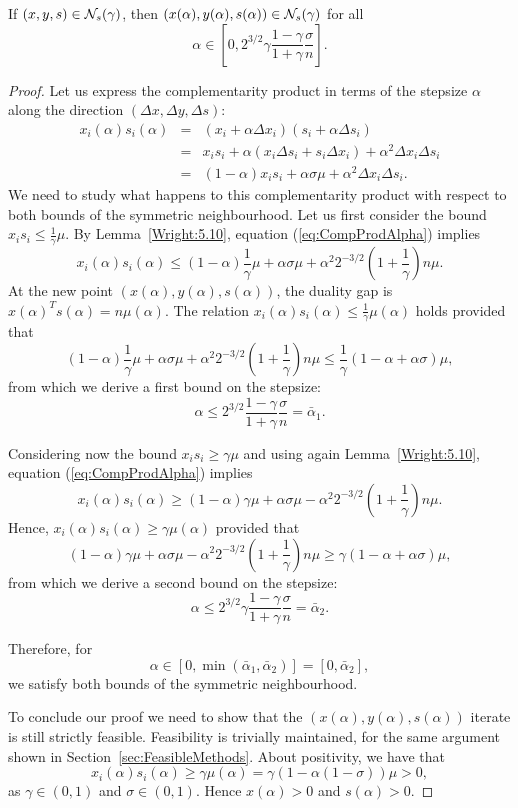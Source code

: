 \begin{theorem} \label{th:SymNeighbourhood}
  If $(x,y,s)\in\mathcal{N}_s(\gamma)$, then 
  $\left(x(\alpha),y(\alpha),s(\alpha)\right)\in\mathcal{N}_s(\gamma)$ for all
  \[
  \alpha\in \left[0,2^{3/2}\gamma\frac{1-\gamma}{1+\gamma}\frac{\sigma}{n} \right].
  \]
\end{theorem}
\begin{proof}
Let us express the complementarity product in terms of the stepsize 
$\alpha$ along the direction $(\Delta x, \Delta y, \Delta s)$:
%
\begin{eqnarray} \label{eq:CompProdAlpha}
x_i(\alpha)s_i(\alpha)&=&(x_i+\alpha\Delta x_i)(s_i+\alpha\Delta s_i)\nonumber\\ 
&=& x_is_i+\alpha(x_i\Delta s_i +s_i\Delta x_i) +\alpha^2\Delta x_i\Delta s_i\\
&=& (1-\alpha)x_is_i + \alpha\sigma\mu + \alpha^2\Delta x_i\Delta s_i.\nonumber
\end{eqnarray}
%
We need to study what happens to this complementarity product 
with respect to both bounds of the symmetric neighbourhood.
%
Let us first consider the bound $x_is_i\le \frac{1}{\gamma}\mu$.
By Lemma~\ref{Wright:5.10}, equation (\ref{eq:CompProdAlpha}) implies
\[
x_i(\alpha)s_i(\alpha) \le (1-\alpha)\frac{1}{\gamma}\mu +\alpha\sigma\mu 
+ \alpha^2 2^{-3/2}\left( 1+ \frac{1}{\gamma} \right)n\mu.
\]
At the new point $(x(\alpha),y(\alpha),s(\alpha))$, the duality gap
is $x(\alpha)^Ts(\alpha) = n\mu(\alpha)$.
The relation $x_i(\alpha)s_i(\alpha)\le \frac{1}{\gamma}\mu(\alpha)$ 
holds provided that
\[
(1-\alpha)\frac{1}{\gamma}\mu +\alpha\sigma\mu + \alpha^2 2^{-3/2}\left( 1+ \frac{1}{\gamma} \right)n\mu 
\le\frac{1}{\gamma}(1-\alpha+\alpha\sigma)\mu,
\]
from which we derive a first bound on the stepsize:
\[
\alpha \le 2^{3/2}\frac{1-\gamma}{1+\gamma}\frac{\sigma}{n} = \bar\alpha_1.
\]

Considering now the bound $x_is_i\ge \gamma\mu$ and using again
Lemma~\ref{Wright:5.10}, equation (\ref{eq:CompProdAlpha}) implies
\[
x_i(\alpha)s_i(\alpha) \ge (1-\alpha)\gamma\mu + \alpha\sigma\mu 
- \alpha^2 2^{-3/2}\left( 1+ \frac{1}{\gamma} \right)n\mu.
\]
Hence, $x_i(\alpha)s_i(\alpha)\ge \gamma\mu(\alpha)$ provided that
\[
(1-\alpha)\gamma\mu + \alpha\sigma\mu- \alpha^2 2^{-3/2}\left( 1+ \frac{1}{\gamma} \right)n\mu 
\ge\gamma(1-\alpha+\alpha\sigma)\mu,
\]
from which we derive a second bound on the stepsize:
\[
\alpha\le 2^{3/2}\gamma\frac{1-\gamma}{1+\gamma}\frac{\sigma}{n} =\bar\alpha_2.
\]

Therefore, for
\[
\alpha \in [0,\min(\bar\alpha_1,\bar\alpha_2)] = [0, \bar\alpha_2],
\]
we satisfy both bounds of the symmetric neighbourhood.

To conclude our proof we need to show that the 
$(x(\alpha),y(\alpha),s(\alpha))$ iterate is still strictly feasible.
Feasibility is trivially maintained, for the same argument shown 
in Section~\ref{sec:FeasibleMethods}.
About positivity, we have that
\[
  x_i(\alpha)s_i(\alpha) \ge \gamma \mu(\alpha) 
                         = \gamma(1 - \alpha(1-\sigma))\mu > 0,
\]
as $\gamma\in (0,1)$ and $\sigma \in (0,1)$. 
Hence $x(\alpha)>0$ and $s(\alpha)>0$.
\end{proof}

